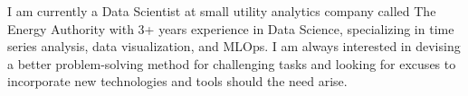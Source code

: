 

\begin{cvparagraph}

I am currently a Data Scientist at small utility analytics company called The Energy Authority with 3+ years experience in Data Science, specializing in time series analysis, data visualization, and MLOps. I am always interested in devising a better problem-solving method for challenging tasks and looking for excuses to incorporate new technologies and tools should the need arise.
\end{cvparagraph}
